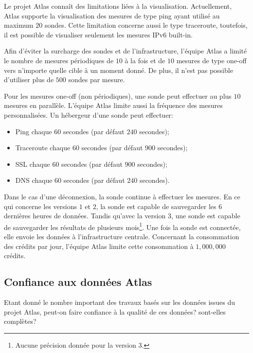 Le projet Atlas connaît des limitations  liées à la visualisation. Actuellement,  Atlas supporte la visualisation des mesures de type ping ayant utilisé au maximum $20$  sondes. Cette limitation concerne aussi le type traceroute, toutefois,  il est possible de visualiser seulement les mesures IPv6 built-in.

Afin d'éviter la surcharge  des sondes et de l'infrastructure, l'équipe Atlas a limité le nombre de mesures périodiques de $10$ à la fois et de $10$ mesures de type one-off vers n'importe quelle cible à un moment donné. De plus, il n'est pas possible d'utiliser  plus de $500$ sondes par mesure.

Pour les mesures one-off (non périodiques), une sonde peut effectuer au plus $10$ mesures en parallèle. L'équipe Atlas limite aussi la fréquence des mesures personnalisées. Un hébergeur d'une sonde peut effectuer:

\begin{itemize}
	\item  Ping chaque $60$ secondes (par défaut  $240$ secondes);
	\item  Traceroute chaque $60$ secondes (par défaut  $900$ secondes);
	\item  SSL chaque $60$ secondes (par défaut  $900$ secondes);
	\item  DNS chaque $60$ secondes (par défaut $240$ secondes).
\end{itemize}

Dans le cas d'une déconnexion, la sonde continue à effectuer les mesures. En ce qui concerne les versions $1$ et $2$, la sonde est capable de sauvegarder les  $6$ dernières heures de données. Tandis qu'avec  la  version $3$, une sonde est capable de sauvegarder les résultats de plusieurs mois\footnote{Aucune précision donnée pour la version $3$. }. Une fois la sonde est connectée, elle envoie les  données à l'infrastructure centrale.
Concernant la consommation des crédits par jour, l'équipe Atlas limite cette consommation à  $1,000,000$ crédits.


\subsection{Confiance aux données Atlas}

Etant donné le nombre important des travaux basés sur les données issues du projet Atlas, peut-on faire confiance à la qualité de ces données?  sont-elles complètes?

